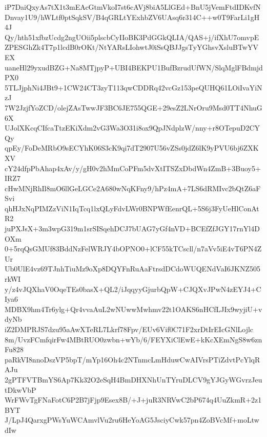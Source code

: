 iP7DaiQxyAs7tX1t3mEAcGtmVkoI7st6cAVj8biA5LlGEd+BnU5jVemFtdIDKvfN
Dnvay1U9/hWLtf0ptSqkSV/B4qGRLtYExhbZV6UAsq6r314C++w0T9FarLi1gH4J
Qy/hth51xfbzUcdg2ngUOii5plscbCyIIoBK3PdGGkQLIA/QAS+j/ifXhU7omvpE
ZPESGhZk4T7p1lcdB0rOKt/NtYARsLIohwtJ0iSsQBJJgsTyYGhsvXsluBTwYVEX
uaneHl29yxudBZG+Na8MTjpyP+UBI4BEKPU1BufBzrudUfWN/SlqMglFBdmjdPX0
5TLJjphNi4JBt9+1CW24CT3zyT113qwCDDRq42vcGz153peQUHQ61LOiIvaYiNzJ
7W2JzjfYoZCD/olejZAsTwwJF3BC6JE755QGE+29esZ2LNrOru9Msd0TT4NhuG6X
UJolXKcqCIfcaTtzEKiXdm2vG3Wa3O31i8ox9QpJNdplzW/nny+r8OTepuD2CYQy
qpEy/FoDeMRbO9sECYhK06S3cK9qi7dT2907U56vZSs0jdZ6lK9yPVU6bj6ZXKXV
cY24dfpPbAhap4xAv/y/gH0v2hMmCoPFm5dvXtITSZxDbdWn4ZmB+3Buoy5+IRZ7
cHwMNjRhIl8mO6llGeLGCe2A680wNqKFny9/hPz4mA+7LS6dRMIvc2bQtZ6aFSvi
qhHJxNqPIMZzViN1IqTcq1lxQLyFdvLWr0BNPWfEenrQL+5S6j3FyUeHlConAtR2
juPXJsX+3m3wpG319m1srSISqehDCJ7bUAG7yGf4nVD+BCEfZfJGY17rnYl4DOXm
0+5rqQsGMUf83BddNzFelWRJY4bOPNO0+lCF55kTCscll/n7aVv5iE4vT6PN4ZUr
Ub0UlE4vz69TJnhTiuMz9oXp8DQYFnRuAaFtrsdDCdoWUQENdVaI6JKNZ505rkWI
y/z4vJQXhaV0OqeTEs0basX+QL2/iJqqyyGjurbQpW+CJQXvJPwN4zEYJ4+CIya6
MDBX9hm4Tr6ylg+Qr4vvaAuL2wNUwwMwhmv22t1OAKS6nHCfLJIx9wyjiU+vdyNb
iZ2DMPRJS7dzu95aAwXTeRL7Lkrf78Fpv/EUv6Vif0C71F2xrDtIrEIcGNlLojlc
8m/UvzFCmfqirFw4MBtRUO0zwbn+wYb/6/FEYXiClEwE+kKcXEmNgS8w6znFu828
paRkVI8nnoDszVP5bpT/mYp16Oh4c2NTnmcLmHduwCwAIVrsPTiZdvtPcYlqRAJu
2gPTFVTBmYS6Ap7Kk32O2eSqH4BmDHXNhUnTYruDLCV9gYJGyWGvrzJeutDkwVbP
WrFWvTgFNaFotC6P2B7jFjp9Esex8B/+J+juR3NRVwC2bP674q4UuZkmR+2z1BYT
J/LpJ4QarxgPWsYuWCAmvlVu2ru6HeYoAG5JsciyCwk57pn4ZoBVcMf+moLtwdIw
